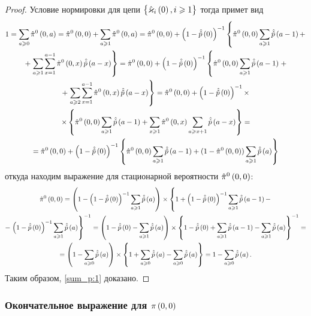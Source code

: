 \documentclass[a4paper,14pt,russian]{article}
\newcommand{\Markkhato}[0]{\brrr{ \hat{\vk}_i\br{0}, i \geqslant 1}}
\newcommand{\p}{\hat{p}}
\begin{document}
\begin{proof}
Условие нормировки для цепи $\Markkhato$ тогда примет вид
\begin{multline*}
 1= \sum_{a \geqslant 0}  \hat{\pi}^0 \br{0,a}  = \hat{\pi}^0 \br{0,0} + \sum_{a \geqslant 1}\hat{\pi}^0 \br{0,a}  =  
\hat{\pi}^0 \br{0,0} + \br{1-\hat{\p}\br{0}}^{-1}\left\{\hat{\pi}^0 \br{0,0}\sum_{a \geqslant 1} \hat{\p}\br{a-1} + \right. \\ + \left.
\sum_{a \geqslant 1} \sum_{x=1}^{a-1}\hat{\pi}^0 \br{0,x}\hat{\p}\br{a-x}\right\}=
 \hat{\pi}^0 \br{0,0} + \br{1-\hat{\p}\br{0}}^{-1}\left\{ \hat{\pi}^0 \br{0,0}\sum_{a \geqslant 1} \hat{\p}\br{a-1} \right. +\\
 + \left. \sum_{a \geqslant 2} \sum_{x=1}^{a-1}\hat{\pi}^0 \br{0,x}\hat{\p}\br{a-x}\right\}=
\hat{\pi}^0 \br{0,0} +\br{1-\hat{\p}\br{0}}^{-1}\times \\ \times \brrr{ \hat{\pi}^0 \br{0,0}\sum_{a \geqslant 1}\hat{\p}\br{a-1} + 
\sum_{x \geqslant 1}\hat{\pi}^0 \br{0,x}\sum_{a \geqslant x+1} \hat{\p}\br{a-x}}=\\=
\hat{\pi}^0 \br{0,0}+ \br{1-\hat{\p}\br{0}}^{-1}\brrr{\hat{\pi}^0 \br{0,0}\sum_{a \geqslant 1} \hat{\p}\br{a-1}+ 
(1 -\hat{\pi}^0 \br{0,0}) \sum_{a \geqslant 1} \hat{\p}\br{a}}
\end{multline*}
откуда находим выражение для стационарной вероятности $\hat{\pi}^0\left(0,0\right)$:
\begin{multline*}
 \hat{\pi}^0\br{0,0} = \br{1 -\br{1-\hat{\p}\br{0}}^{-1}\sum_{a \geqslant 1} \hat{\p}\br{a}} \times \left\{1 +  \br{1-\hat{\p}\br{0}}^{-1}
\sum_{a \geqslant 1}\hat{\p}\br{a-1} -\right. \\- \left. \br{1-\hat{\p}\br{0}}^{-1} \sum_{a \geqslant 1} \hat{\p}\br{a}\right\}^{-1} = 
 \br{1-\hat{\p}\br{0} -\sum_{a \geqslant 1} \hat{\p}\br{a}} \times \brrr{1-\hat{\p}\br{0} +  \sum_{a \geqslant 1} \hat{\p}\br{a-1} - 
 \sum_{a \geqslant 1} \hat{\p}\br{a}}^{-1} =\\=  
\br{1-\sum_{a \geqslant 0} \hat{\p}\br{a}} \times \brrr{1 +  \sum_{a \geqslant 0} \hat{\p}\br{a}- 
 \sum_{a \geqslant 0} \hat{\p}\br{a}} = 
1-\sum_{a \geqslant 0} \hat{\p}\br{a}.
\end{multline*}
Таким образом, \eqref{sum_p:1} доказано.
\end{proof}
\subsubsection{Окончательное выражение для $\pi\left(0,0\right)$}
\end{document}

